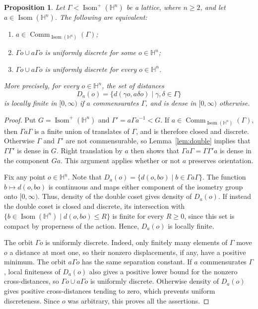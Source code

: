 \documentclass[reqno]{amsart}
\newtheorem{proposition}[theorem]{Proposition}
\theoremstyle{remark}
\DeclareMathOperator{\Comm}{Comm}
\begin{document}
\begin{proposition}\label{prop:orbitsep}
Let $\Gamma<\operatorname{Isom}^+(\mathbb H^n)$ be a lattice, where $n\ge2$, and let $a\in\operatorname{Isom}(\mathbb H^n)$. The following are equivalent:
\begin{enumerate}
\item $a\in\Comm_{\operatorname{Isom}(\mathbb H^n)}(\Gamma)$;
\item $\Gamma o\cup a\Gamma o$ is uniformly discrete for some $o\in\mathbb H^n$;
\item $\Gamma o\cup a\Gamma o$ is uniformly discrete for every $o\in\mathbb H^n$.
\end{enumerate}
More precisely, for every $o\in\mathbb H^n$, the set of distances
$$
D_a(o)=\{d(\gamma o,a\delta o) \mid \gamma,\delta\in\Gamma\}
$$
is locally finite in $[0,\infty)$ if $a$ commensurates $\Gamma$, and is dense in $[0,\infty)$ otherwise.
\end{proposition}

\begin{proof}
Put $G=\operatorname{Isom}^+(\mathbb H^n)$ and $\Gamma'=a\Gamma a^{-1}<G$. If $a\in\Comm_{\operatorname{Isom}(\mathbb H^n)}(\Gamma)$, then $\Gamma a\Gamma$ is a finite union of translates of $\Gamma$, and is therefore closed and discrete. Otherwise $\Gamma$ and $\Gamma'$ are not commensurable, so Lemma~\ref{lem:double} implies that $\Gamma\Gamma'$ is dense in $G$. Right translation by $a$ then shows that $\Gamma a\Gamma=\Gamma\Gamma'a$ is dense in the component $Ga$. This argument applies whether or not $a$ preserves orientation.

Fix any point $o\in\mathbb H^n$. Note that $D_a(o)=\{d(o,bo)\mid b\in\Gamma a\Gamma\}$. The function $b\mapsto d(o,bo)$ is continuous and maps either component of the isometry group onto $[0,\infty)$. Thus, density of the double coset gives density of $D_a(o)$. If instead the double coset is closed and discrete, its intersection with $\{b\in\operatorname{Isom}(\mathbb H^n) \mid d(o,bo)\le R\}$ is finite for every $R\ge0$, since this set is compact by properness of the action. Hence, $D_a(o)$ is locally finite.

The orbit $\Gamma o$ is uniformly discrete. Indeed, only finitely many elements of $\Gamma$ move $o$ a distance at most one, so their nonzero displacements, if any, have a positive minimum. The orbit $a\Gamma o$ has the same separation constant. If $a$ commensurates $\Gamma$, local finiteness of $D_a(o)$ also gives a positive lower bound for the nonzero cross-distances, so $\Gamma o\cup a\Gamma o$ is uniformly discrete. Otherwise density of $D_a(o)$ gives positive cross-distances tending to zero, which prevents uniform discreteness. Since $o$ was arbitrary, this proves all the assertions.
\end{proof}
\end{document}
